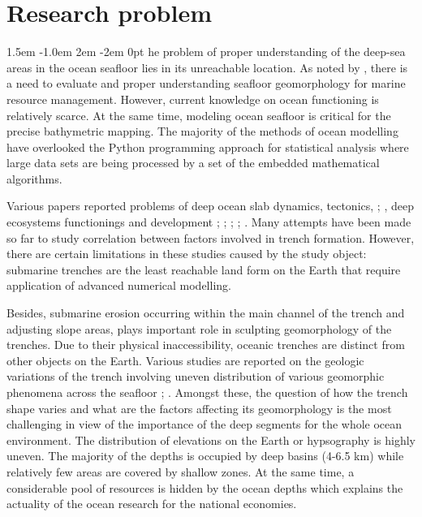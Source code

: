 \documentclass[11pt,a4paper]{report}
\def\pstart#1{\noindent\smash{\lower1.5ex\hbox{\llap{\Cal#1}}\hskip-.1ex}
  \parshape=3 1.5em \dimexpr\hsize-1.0em 2em \dimexpr\hsize-2em 0pt \hsize}
\begin{document}
\pagebreak
\section{Research problem}
\pstart The problem of proper understanding of the deep-sea areas in the ocean seafloor lies in its unreachable location. As noted by \cite{Jamieson2018}, there is a need to evaluate and proper understanding seafloor geomorphology for marine resource management. However, current knowledge on ocean functioning is relatively scarce. At the same time, modeling ocean seafloor is critical for the precise bathymetric mapping. The majority of the methods of ocean modelling have overlooked the Python programming approach for statistical analysis where large data sets are being processed by a set of the embedded mathematical algorithms. 

Various papers reported problems of deep ocean slab dynamics, tectonics, \cite{Oakleyetal2008}; \cite{HeuretLallemand2005}, deep ecosystems functionings and development \cite{Robison2009}; \cite{Osbornetal2009}; \cite{CostelloBerghe2006}; \cite{Clarketal2010}; \cite{Robison2004}. Many attempts have been made so far to study correlation between factors involved in trench formation. However, there are certain limitations in these studies caused by the study object: submarine trenches are the least reachable land form on the Earth that require application of advanced numerical modelling. 

Besides, submarine erosion occurring within the main channel of the trench and adjusting slope areas, plays important role in sculpting geomorphology of the trenches. Due to their physical inaccessibility, oceanic trenches are distinct from other objects on the Earth. Various studies are reported on the geologic variations of the trench involving uneven distribution of various geomorphic phenomena across the seafloor \cite{Michibayashietal2007}; \cite{Grandetal1997}. Amongst these, the question of how the trench shape varies and what are the factors affecting its geomorphology is the most challenging in view of the importance of the deep segments for the whole ocean environment. The distribution of elevations on the Earth or hypsography is highly uneven. The majority of the depths is occupied by deep basins (4-6.5 km) while relatively few areas are covered by shallow zones. At the same time, a considerable pool of resources is hidden by the ocean depths which explains the actuality of the ocean research for the national economies. 
\end{document}
